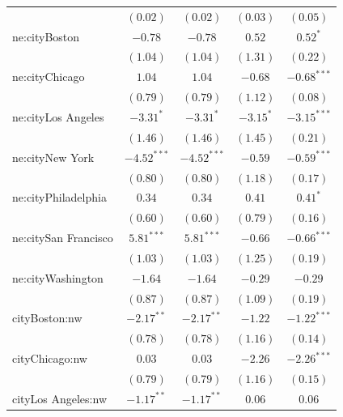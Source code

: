 \documentclass[12pt,letter paper]{article}
\begin{document}
\begin{center}
\begin{longtable}{l c c c c }
                        & $(0.02)$      & $(0.02)$      & $(0.03)$      & $(0.05)$      \\
ne:cityBoston           & $-0.78$       & $-0.78$       & $0.52$        & $0.52^{*}$    \\
                        & $(1.04)$      & $(1.04)$      & $(1.31)$      & $(0.22)$      \\
ne:cityChicago          & $1.04$        & $1.04$        & $-0.68$       & $-0.68^{***}$ \\
                        & $(0.79)$      & $(0.79)$      & $(1.12)$      & $(0.08)$      \\
ne:cityLos Angeles      & $-3.31^{*}$   & $-3.31^{*}$   & $-3.15^{*}$   & $-3.15^{***}$ \\
                        & $(1.46)$      & $(1.46)$      & $(1.45)$      & $(0.21)$      \\
ne:cityNew York         & $-4.52^{***}$ & $-4.52^{***}$ & $-0.59$       & $-0.59^{***}$ \\
                        & $(0.80)$      & $(0.80)$      & $(1.18)$      & $(0.17)$      \\
ne:cityPhiladelphia     & $0.34$        & $0.34$        & $0.41$        & $0.41^{*}$    \\
                        & $(0.60)$      & $(0.60)$      & $(0.79)$      & $(0.16)$      \\
ne:citySan Francisco    & $5.81^{***}$  & $5.81^{***}$  & $-0.66$       & $-0.66^{***}$ \\
                        & $(1.03)$      & $(1.03)$      & $(1.25)$      & $(0.19)$      \\
ne:cityWashington       & $-1.64$       & $-1.64$       & $-0.29$       & $-0.29$       \\
                        & $(0.87)$      & $(0.87)$      & $(1.09)$      & $(0.19)$      \\
cityBoston:nw           & $-2.17^{**}$  & $-2.17^{**}$  & $-1.22$       & $-1.22^{***}$ \\
                        & $(0.78)$      & $(0.78)$      & $(1.16)$      & $(0.14)$      \\
cityChicago:nw          & $0.03$        & $0.03$        & $-2.26$       & $-2.26^{***}$ \\
                        & $(0.79)$      & $(0.79)$      & $(1.16)$      & $(0.15)$      \\
cityLos Angeles:nw      & $-1.17^{**}$  & $-1.17^{**}$  & $0.06$        & $0.06$        \\

\end{longtable}
\end{center}
\end{document}

